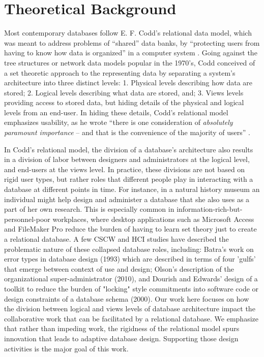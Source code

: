 \section{Theoretical Background}
Most contemporary databases follow E. F. Codd's relational data model, which was meant to address problems of “shared” data banks, by  “protecting users from having to know how data is organized” in a computer system  \cite[p. 377]{Codd_1970}. Going against the tree structures or network data models popular in the 1970's, Codd conceived of a set theoretic approach to the representing data by separating a system's architecture into three distinct levels: 1. Physical levels describing how data are stored; 2. Logical levels describing what data are stored, and; 3. Views levels providing access to stored data, but hiding details of the physical and logical levels from an end-user. In hiding these details, Codd's relational model emphasizes usability, as he wrote “there is one consideration of \emph{absolutely paramount importance} – and that is the convenience of the majority of users” \cite[p.2; emphasis his]{Codd_1971}.

In Codd's relational model, the division of a database's architecture also results in a division of labor between designers and administrators at the logical level, and end-users at the views level. In practice, these divisions are not based on rigid user types, but rather roles that different people play in interacting with a database at different points in time. For instance, in a natural history museum an individual might help design and administer a database that she also uses as a part of her own research. This is especially common in information-rich-but-personnel-poor workplaces, where desktop applications such as Microsoft Access and FileMaker Pro reduce the burden of having to learn set theory just to create a relational database. A few CSCW and HCI studies have described the problematic nature of these collapsed database roles, including: Batra's work on error types in database design (1993) which are described in terms of  four 'gulfs' that emerge between context of use and design; Olson's description of the organizational super-administrator (2010), and Dourish and Edwards' design of a toolkit to reduce the burden of "locking" style commitments into software code or design constraints of a database schema (2000). Our work here focuses on how the division between logical and views levels of database architecture impact the collaborative work that can be facilitated by a relational database. We emphasize that rather than impeding work, the rigidness of the relational model spurs innovation that leads to adaptive database design. Supporting those design activities is the major goal of this work. 


